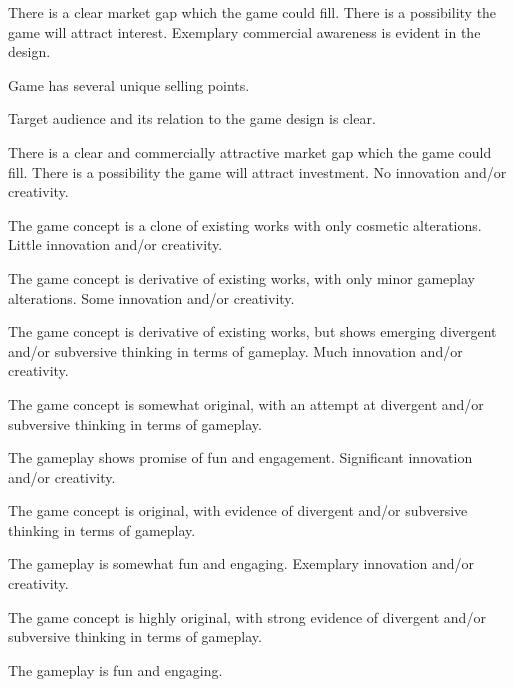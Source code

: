 \documentclass{../fal_assignment}
\begin{document}
\begin{markingrubric}
            \par There is a clear market gap which the game could fill. There is a possibility the game will attract interest.
        \grade Exemplary commercial awareness is evident in the design.
            \par Game has several unique selling points.
            \par Target audience and its relation to the game design is clear.
            \par There is a clear and commercially attractive market gap which the game could fill. There is a possibility the game will attract investment.
%
        \grade\fail No innovation and/or creativity.
            \par The game concept is a clone of existing works with only cosmetic alterations.
        \grade Little innovation and/or creativity.
            \par The game concept is derivative of existing works, with only minor gameplay alterations.
        \grade Some innovation and/or creativity.
            \par The game concept is derivative of existing works, but shows emerging divergent and/or subversive thinking in terms of gameplay.
        \grade Much innovation and/or creativity.
            \par The game concept is somewhat original, with an attempt at divergent and/or subversive thinking in terms of gameplay.
            \par The gameplay shows promise of fun and engagement.
        \grade Significant innovation and/or creativity.
            \par The game concept is original, with evidence of divergent and/or subversive thinking in terms of gameplay.
            \par The gameplay is somewhat fun and engaging.
        \grade Exemplary innovation and/or creativity.
            \par The game concept is highly original, with strong evidence of divergent and/or subversive thinking in terms of gameplay.
            \par The gameplay is fun and engaging.
\end{markingrubric}
\end{document}
